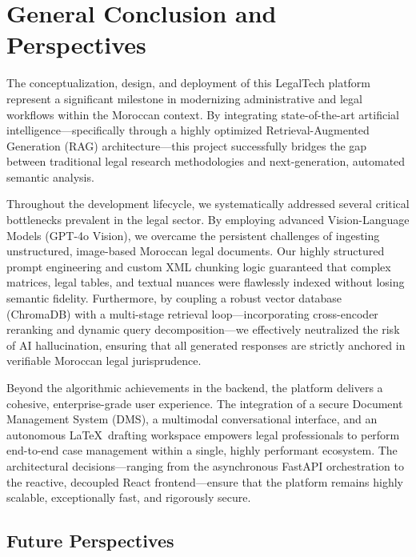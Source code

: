 \chapter*{General Conclusion and Perspectives}


\label{chap:General_Conclusion} 

The conceptualization, design, and deployment of this LegalTech platform represent a significant milestone in modernizing administrative and legal workflows within the Moroccan context. By integrating state-of-the-art artificial intelligence—specifically through a highly optimized Retrieval-Augmented Generation (RAG) architecture—this project successfully bridges the gap between traditional legal research methodologies and next-generation, automated semantic analysis. 

Throughout the development lifecycle, we systematically addressed several critical bottlenecks prevalent in the legal sector. By employing advanced Vision-Language Models (GPT-4o Vision), we overcame the persistent challenges of ingesting unstructured, image-based Moroccan legal documents. Our highly structured prompt engineering and custom XML chunking logic guaranteed that complex matrices, legal tables, and textual nuances were flawlessly indexed without losing semantic fidelity. Furthermore, by coupling a robust vector database (ChromaDB) with a multi-stage retrieval loop—incorporating cross-encoder reranking and dynamic query decomposition—we effectively neutralized the risk of AI hallucination, ensuring that all generated responses are strictly anchored in verifiable Moroccan legal jurisprudence.

Beyond the algorithmic achievements in the backend, the platform delivers a cohesive, enterprise-grade user experience. The integration of a secure Document Management System (DMS), a multimodal conversational interface, and an autonomous \LaTeX\ drafting workspace empowers legal professionals to perform end-to-end case management within a single, highly performant ecosystem. The architectural decisions—ranging from the asynchronous FastAPI orchestration to the reactive, decoupled React frontend—ensure that the platform remains highly scalable, exceptionally fast, and rigorously secure.

\section*{Future Perspectives}

